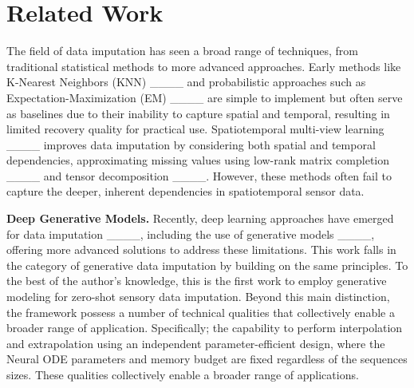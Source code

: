 \section{Related Work}
\label{sec:related_work}

 The field of data imputation has seen a broad range of techniques, from traditional statistical methods to more advanced approaches. Early methods like K-Nearest Neighbors (KNN) ____ and probabilistic approaches such as Expectation-Maximization (EM) ____ are simple to implement but often serve as baselines due to their inability to capture spatial and temporal, resulting in limited recovery quality for practical use. Spatiotemporal multi-view learning ____ improves data imputation by considering both spatial and temporal dependencies, approximating missing values using low-rank matrix completion ____ and tensor decomposition ____. However, these methods often fail to capture the deeper, inherent dependencies in spatiotemporal sensor data.

\textbf{Deep Generative Models.} %
Recently, deep learning approaches have emerged for data imputation ____, including the use of generative models ____, offering more advanced solutions to address these limitations.
This work falls in the category of generative data imputation by building on the same principles. To the best of the author's knowledge, this is the first work to employ generative modeling for zero-shot sensory data imputation. Beyond this main distinction, the framework possess a number of technical qualities that collectively enable a broader range of application. Specifically; the capability to perform interpolation and extrapolation using an independent parameter-efficient design, where the Neural ODE parameters and memory budget are fixed regardless of the sequences sizes. These qualities collectively enable a broader range of applications. 

